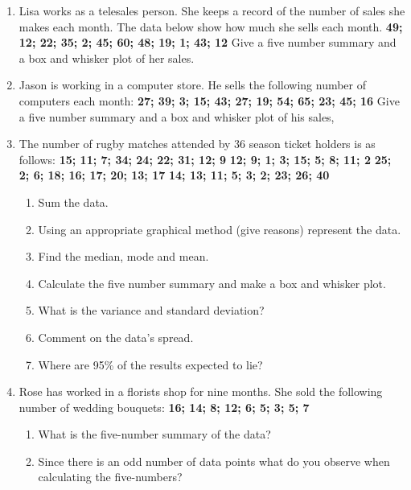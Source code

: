 {
\begin{enumerate}
\item Lisa works as a telesales person. She keeps a record of the number of sales she makes each month. The data below show how much she sells each month. \newline
\textbf{49; 12; 22; 35; 2; 45; 60; 48; 19; 1; 43; 12} \newline
Give a five number summary and a box and whisker plot of her sales. 
\item Jason is working in a computer store. He sells the following number of computers each month: \newline
\textbf{27; 39; 3; 15; 43; 27; 19; 54; 65; 23; 45; 16} \newline
Give a five number summary and a box and whisker plot of his sales,
\item The number of rugby matches attended by 36 season ticket holders is as follows: \newline
\textbf{15; 11; 7; 34; 24; 22; 31; 12; 9} \newline
\textbf{12; 9; 1; 3; 15; 5; 8; 11; 2} \newline
\textbf{25; 2; 6; 18; 16; 17; 20; 13; 17} \newline
\textbf{14; 13; 11; 5; 3; 2; 23; 26; 40} \newline
	\begin{enumerate}
	\item Sum the data.
	\item Using an appropriate graphical method (give reasons) represent the data.
	\item Find the median, mode and mean.
	\item Calculate the five number summary and make a box and whisker plot.
	\item What is the variance and standard deviation?
	\item Comment on the data's spread.
	\item Where are 95\% of the results expected to lie?
	\end{enumerate}
\item Rose has worked in a florists shop for nine months. She sold the following number of wedding bouquets: \newline
\textbf{16; 14; 8; 12; 6; 5; 3; 5; 7} \newline
	\begin{enumerate}
	\item What is the five-number summary of the data?
	\item Since there is an odd number of data points what do you observe when calculating the five-numbers?
	\end{enumerate}
\end{enumerate}
}

